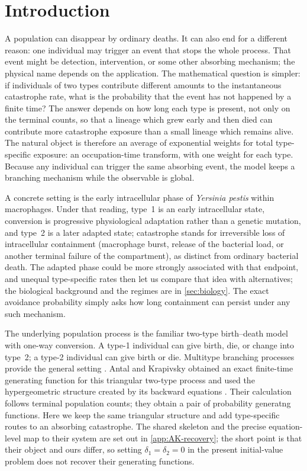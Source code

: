 \section{Introduction}
\label{sec:introduction}

A population can disappear by ordinary deaths. It can also end for a different reason: one individual may trigger an event that stops the whole process. That event might be detection, intervention, or some other absorbing mechanism; the physical name depends on the application. The mathematical question is simpler: if individuals of two types contribute different amounts to the instantaneous catastrophe rate, what is the probability that the event has not happened by a finite time? The answer depends on how long each type is present, not only on the terminal counts, so that a lineage which grew early and then died can contribute more catastrophe exposure than a small lineage which remains alive. The natural object is therefore an average of exponential weights for total type-specific exposure: an occupation-time transform, with one weight for each type. Because any individual can trigger the same absorbing event, the model keeps a branching mechanism while the observable is global.

A concrete setting is the early intracellular phase of \textit{Yersinia pestis} within macrophages. Under that reading, type~1 is an early intracellular state, conversion is progressive physiological adaptation rather than a genetic mutation, and type~2 is a later adapted state; catastrophe stands for irreversible loss of intracellular containment (macrophage burst, release of the bacterial load, or another terminal failure of the compartment), as distinct from ordinary bacterial death. The adapted phase could be more strongly associated with that endpoint, and unequal type-specific rates then let us compare that idea with alternatives; the biological background and the regimes are in \cref{sec:biology}. The exact avoidance probability simply asks how long containment can persist under any such mechanism.

The underlying population process is the familiar two-type birth--death model with one-way conversion. A type-1 individual can give birth, die, or change into type~2; a type-2 individual can give birth or die. Multitype branching processes provide the general setting \cite{AthreyaNey1972}. Antal and Krapivsky obtained an exact finite-time generating function for this triangular two-type process and used the hypergeometric structure created by its backward equations \cite{AntalKrapivsky2011}. Their calculation follows terminal population counts; they obtain a pair of probability generatng functions. Here we keep the same triangular structure and add type-specific routes to an absorbing catastrophe. The shared skeleton and the precise equation-level map to their system are set out in \cref{app:AK-recovery}; the short point is that their object and ours differ, so setting $\delta_1=\delta_2=0$ in the present initial-value problem does not recover their generating functions. 

